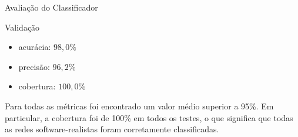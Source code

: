 \begin{section}{Avaliação do Classificador}
\begin{subsection}{Validação}
		\begin{itemize}
			\item acurácia:  $98,0\%$
			\item precisão:  $96,2\%$
			\item cobertura: $100,0\%$
		\end{itemize}

		Para todas as métricas foi encontrado um valor médio superior a 95\%. Em particular, a cobertura foi de 100\% em todos os testes, o que significa que todas as redes software-realistas foram corretamente classificadas. %

		

\end{subsection}	
\end{section}

